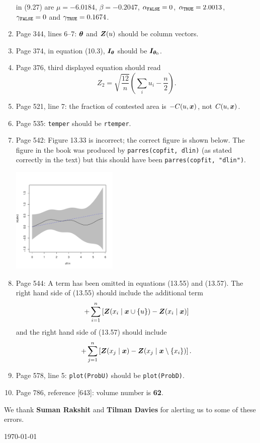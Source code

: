 \documentclass[12pt,a4paper]{article}
\newcommand{\boldmaths}[1]{{\ensuremath\boldsymbol{#1}}}
\newcommand{\bx}{\boldmaths x}
\newcommand{\bZ}{\boldmaths Z}
\newcommand{\btheta}{\boldmaths\theta}
\begin{document}
\begin{enumerate}
  in (9.27) are $\mu =-6.0184$, $\beta=-0.2047$,
  $\alpha_{\mbox{\scriptsize \texttt{FALSE}}} = 0$,
  $\alpha_{\mbox{\scriptsize \texttt{TRUE}}} = 2.0013$,
  $\gamma_{\mbox{\scriptsize \texttt{FALSE}}} = 0$ and
  $\gamma_{\mbox{\scriptsize \texttt{TRUE}}} = 0.1674$.
\item Page 344, lines 6--7: $\btheta$ and $\bZ(u)$ 
should be column vectors.
\item Page 374, in equation (10.3), ${\boldmaths I}_\btheta$
  should be ${\boldmaths I}_{\btheta_0}$.
\item Page 376, third displayed equation should read
  \[
       Z_2 = \sqrt{\frac{12}{n}} \left(\sum_i u_i - \frac n 2\right).
  \]
\item Page 521, line 7: the fraction of contested area is $-C(u, \bx)$,
not $C(u,\bx)$.
\item Page 535: \texttt{temper} should be \texttt{rtemper}.
  \pagebreak
\item Page 542: Figure 13.33 is incorrect; the correct figure is shown
  below. The figure in the book was produced by \texttt{parres(copfit, dlin)}
  (as stated correctly in the text)
  but this should have been \texttt{parres(copfit, "dlin")}.

  \centerline{\includegraphics*[width=0.4\textwidth]{fig1333}}
  
\item Page 544: A term has been omitted in equations (13.55) and (13.57).
The right hand side of (13.55) should include the additional term
\[
   + \sum_{i=1}^n \left[ \bZ(x_i \mid \bx \cup \{u\}) - \bZ(x_i \mid \bx) \right]
\]
and the right hand side of (13.57) should include
\[
  + \sum_{j=1}^n \left[ \bZ(x_j \mid \bx) - \bZ(x_j \mid \bx \setminus \{x_i\}) \right].
\]
\item Page 578, line 5: \texttt{plot(ProbU)} should be \texttt{plot(ProbD)}.
\item Page 786, reference [643]: volume number is \textbf{62}.
\end{enumerate}

We thank \textbf{Suman Rakshit} and \textbf{Tilman Davies}
for alerting us to some of these errors.\\

\vspace*{\fill}


\hspace*{\fill} \today
\end{document}
